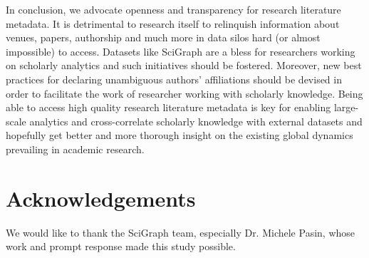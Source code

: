 \documentclass{llncs}
\begin{document}
In conclusion, we advocate openness and transparency for research literature metadata. It is detrimental to research itself to relinquish information about venues, papers, authorship and much more in data silos hard (or almost impossible) to access.
Datasets like SciGraph are a bless for researchers working on scholarly analytics and such initiatives should be fostered.
Moreover, new best practices for declaring unambiguous authors' affiliations should be devised in order to facilitate the work of researcher working with scholarly knowledge.
Being able to access high quality research literature metadata is key for enabling large-scale analytics and cross-correlate scholarly knowledge with external datasets and hopefully get better and more thorough insight on the existing global dynamics prevailing in academic research.


\section*{Acknowledgements}
We would like to thank the SciGraph team, especially Dr. Michele Pasin, whose work and prompt response made this study possible.


%


\end{document}
